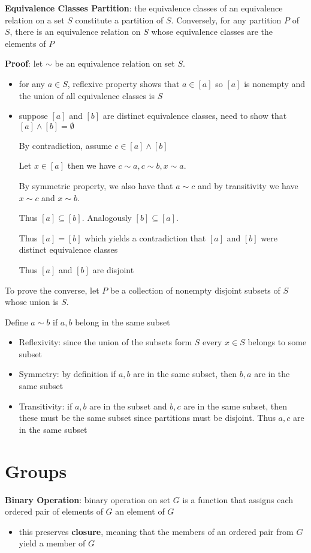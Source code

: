 \documentclass{article}
\begin{document}
 \textbf{Equivalence Classes Partition}: the equivalence classes of an equivalence relation on a set $S$ constitute a partition of $S$. Conversely, for any partition $P$ of $S$, there is an equivalence relation on $S$ whose equivalence classes are the elements of $P$

 \textbf{Proof}: let $\sim$ be an equivalence relation on set $S$.
 \begin{itemize}
   \item for any $a \in S$, reflexive property shows that $a \in [a]$ so $[a]$ is nonempty and the union of all equivalence classes is $S$
  \item suppose $[a]$ and $[b]$ are distinct equivalence classes, need to show that $[a] \wedge [b] = \emptyset$

    By contradiction, assume $c \in [a] \wedge [b]$

    Let $x \in [a]$ then we have $c \sim a, c \sim b, x \sim a$.

    By symmetric property, we also have that $a \sim c$ and by transitivity we have $x \sim c$ and $x \sim b$.

    Thus $[a] \subseteq [b]$. Analogously $[b] \subseteq [a]$.

    Thus $[a] = [b]$ which yields a contradiction that $[a]$ and $[b]$ were distinct equivalence classes

    Thus $[a]$ and $[b]$ are disjoint
 \end{itemize}
 To prove the converse, let $P$ be a collection of nonempty disjoint subsets of $S$ whose union is $S$.

 Define $a \sim b$ if $a,b$ belong in the same subset
 \begin{itemize}
   \item Reflexivity: since the union of the subsets form $S$ every $x \in S$ belongs to some subset
    \item Symmetry: by definition if $a, b$ are in the same subset, then $b, a$ are in the same subset
    \item Transitivity: if $a, b$ are in the subset and $b, c$ are in the same subset, then these must be the same subset since partitions must be disjoint. Thus $a, c$ are in the same subset
 \end{itemize}
  \section{Groups}
  \textbf{Binary Operation}: binary operation on set $G$ is a function that assigns each ordered pair of elements of $G$ an element of $G$
  \begin{itemize}
    \item this preserves \textbf{closure}, meaning that the members of an ordered pair from $G$ yield a member of $G$
  \end{itemize}
\end{document}
